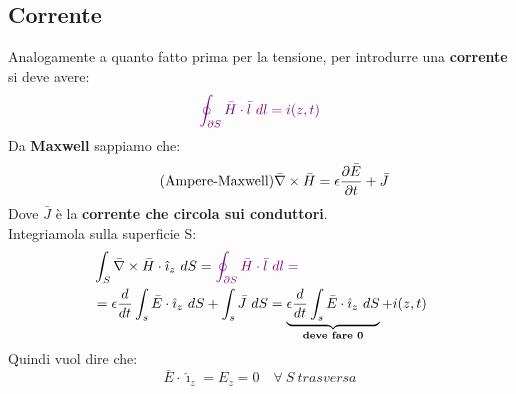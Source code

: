 \subsection{Corrente}
Analogamente a quanto fatto prima per la tensione, per introdurre una \textbf{corrente} si deve avere:
\begin{equation*}
    \color{violet}{\oint_{\partial S} \bar{H}\cdot \bar{l} \ dl = i(z,t)}
\end{equation*}
Da \textbf{Maxwell} sappiamo che:
\begin{equation*}
    \tag{Ampere-Maxwell}
    \bar{\nabla} \times \bar{H} = \epsilon \frac{\partial \bar{E}}{\partial t} + \bar{J}
\end{equation*}
Dove $\bar{J}$ è la \textbf{corrente che circola sui conduttori}.\\
Integriamola sulla superficie S\@:
\begin{equation*}
\begin{aligned}
    &\int_S \rot{\bar{H}} \cdot \hat{\imath}_z \ dS = \color{violet}{\oint_{\partial S} \bar{H}\cdot \bar{l} \ dl} = \\
    & =\epsilon \frac{d}{dt} \int_s \bar{E}\cdot \hat{\imath}_z \ dS  + \int_s \bar{J} \ dS = \underbrace{\epsilon \frac{d}{dt} \int_s \bar{E}\cdot \hat{\imath}_z \ dS}_{\textbf{deve fare 0}}  + i(z,t)
\end{aligned}
\end{equation*}
Quindi vuol dire che:
\begin{equation*}
    \boxed{\bar{E} \cdot \hat{\imath}_z = E_z = 0 \quad \forall \ S \ trasversa}
\end{equation*}
